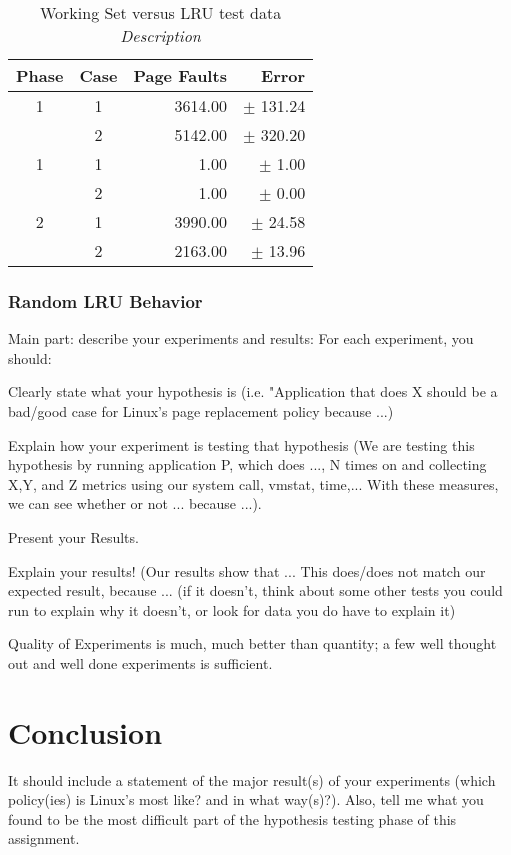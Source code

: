 \documentclass[twocolumn]{article}
\begin{document}
\begin{table}[h]
\begin{center}
\begin{tabular}{|c|c|r|r|}
\hline
{\bf Phase } & {\bf Case} & {\bf Page Faults} & {\bf Error } \\
\hline
1 & 1 & 3614.00 & $\pm$ 131.24 \\
& 2 & 5142.00 & $\pm$ 320.20 \\
\hline
1& 1 & 1.00 & $\pm$ 1.00 \\
& 2 & 1.00 & $\pm$ 0.00 \\
\hline
2 & 1 & 3990.00 & $\pm$ 24.58 \\
& 2 & 2163.00 & $\pm$ 13.96 \\
\hline
\end{tabular}
\caption{ \label{rawio} Working Set versus LRU test data
{\em  Description  }}
\end{center}
\end{table}


\subsubsection{Random LRU Behavior}

Main part: describe your experiments and results: For each experiment, you should:

Clearly state what your hypothesis is (i.e. "Application that does X should be a bad/good case for Linux's page replacement policy because ...)

Explain how your experiment is testing that hypothesis (We are testing this hypothesis by running application P, which does ..., N times on and collecting X,Y, and Z metrics using our system call, vmstat, time,... With these measures, we can see whether or not ... because ...).

Present your Results.

Explain your results! 
(Our results show that ... This does/does not match our expected result, because ... (if it doesn't, think about some other tests you could run to explain why it doesn't, or look for data you do have to explain it)

Quality of Experiments is much, much better than quantity; a few well thought out and well done experiments is sufficient.

\section{Conclusion}

It should include a statement of the major result(s) of your experiments (which policy(ies) is Linux's most like? and in what way(s)?). Also, tell me what you found to be the most difficult part of the hypothesis testing phase of this assignment.
\end{document}
